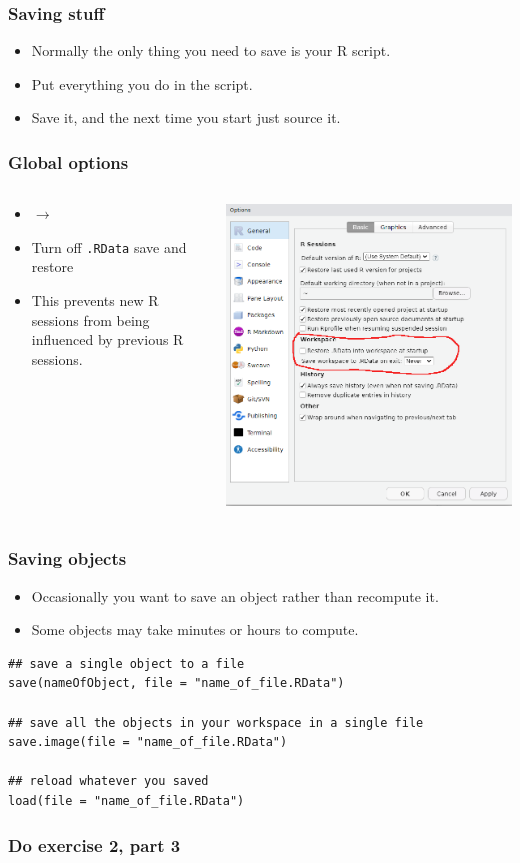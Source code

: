 \documentclass{beamer}
\newcommand{\bi}{\begin{itemize}}
\newcommand{\li}{\item}
\newcommand{\ei}{\end{itemize}}
\newcommand{\arrow}{\ensuremath{\rightarrow}}
\newcommand{\bfr}[1]{\begin{frame}[fragile]\frametitle{{ #1 }}}
\newcommand{\cola}{\begin{columns}\begin{column}{0.5\textwidth}}
\newcommand{\colb}{\end{column}\begin{column}{0.5\textwidth}}
\newcommand{\colc}{\end{column}\end{columns}}
\begin{document}
\bfr{Saving stuff}
\bi
\li Normally the only thing you need to save is your R script.
\li Put everything you do in the script.
\li Save it, and the next time you start just source it.
\ei

\end{frame}


\bfr{Global options}
\cola
\begin{itemize}
\item {}\arrow{}

\item
Turn off \verb|.RData| save and restore
\item
This prevents new R sessions from being influenced
by previous R sessions.
\end{itemize}

\colb
\includegraphics[width=\textwidth]{globaloptions}
\colc
\end{frame}

\bfr{Saving objects}
\bi
\li Occasionally you want to save an object rather than recompute it.
\li Some objects may take minutes or hours to compute.
\ei
\begin{verbatim}
## save a single object to a file
save(nameOfObject, file = "name_of_file.RData")

## save all the objects in your workspace in a single file
save.image(file = "name_of_file.RData")

## reload whatever you saved
load(file = "name_of_file.RData")
\end{verbatim}
\end{frame}


\bfr{Do exercise 2, part 3}
\end{frame}
\end{document}
